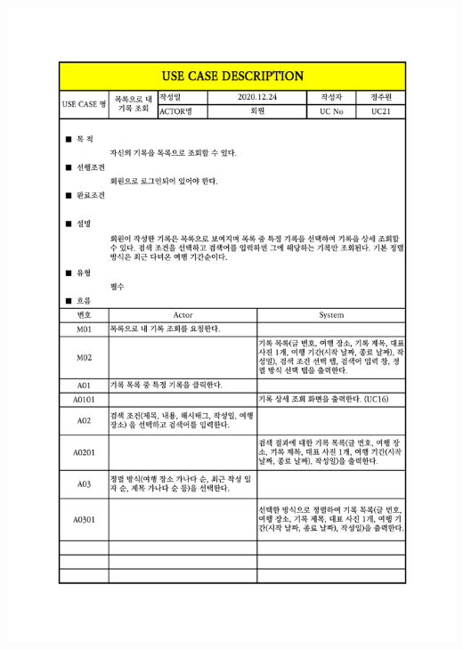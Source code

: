 {{{{{{{{{{{{{{{{{{{{{{{\includegraphics[width=1.1\textwidth]{./Figure/Design/Display/usecase/021.pdf} \\
}}}}}}}}}}}}}}}}}}}}}}}
